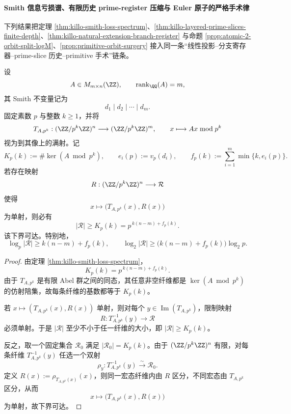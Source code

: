 \paragraph{Smith 信息亏损谱、有限历史 prime-register 压缩与 Euler 原子的严格手术律}
下列结果把定理 \ref{thm:killo-smith-loss-spectrum}、\ref{thm:killo-layered-prime-slices-finite-depth}、\ref{thm:killo-natural-extension-branch-register} 与命题 \ref{prop:atomic-2-orbit-split-logM}、\ref{prop:primitive-orbit-surgery} 接入同一条“线性投影--分支寄存器--prime-slice 历史--primitive 手术”链条。

\begin{theorem}\label{thm:xi-smith-loss-minimal-branch-register}
设
\[
A\in M_{m\times n}(\ZZ),
\qquad
\operatorname{rank}_{\QQ}(A)=m,
\]
其 Smith 不变量记为
\[
d_1\mid d_2\mid\cdots\mid d_m.
\]
固定素数 \(p\) 与整数 \(k\ge 1\)，并将
\[
T_{A,p^k}:(\ZZ/p^k\ZZ)^n\longrightarrow (\ZZ/p^k\ZZ)^m,
\qquad
x\longmapsto Ax\bmod p^k
\]
视为到其像上的满射。记
\[
K_p(k):=\#\ker(A\bmod p^k),
\qquad
e_i(p):=v_p(d_i),
\qquad
f_p(k):=\sum_{i=1}^{m}\min\{k,e_i(p)\}.
\]
若存在映射
\[
R:(\ZZ/p^k\ZZ)^n\longrightarrow \mathcal R
\]
使得
\[
x\longmapsto \bigl(T_{A,p^k}(x),R(x)\bigr)
\]
为单射，则必有
\[
|\mathcal R|\ge K_p(k)=p^{\,k(n-m)+f_p(k)}.
\]
该下界可达。特别地，
\[
\log_p|\mathcal R|\ge k(n-m)+f_p(k),
\qquad
\log_2|\mathcal R|\ge \bigl(k(n-m)+f_p(k)\bigr)\log_2 p.
\]
\end{theorem}
\begin{proof}
由定理 \ref{thm:killo-smith-loss-spectrum}，
\[
K_p(k)=p^{\,k(n-m)+f_p(k)}.
\]
由于 \(T_{A,p^k}\) 是有限 Abel 群之间的同态，其任意非空纤维都是 \(\ker(A\bmod p^k)\) 的仿射陪集，故每条纤维的基数都等于 \(K_p(k)\)。

若 \(x\mapsto (T_{A,p^k}(x),R(x))\) 单射，则对每个 \(y\in\operatorname{Im}(T_{A,p^k})\)，限制映射
\[
R:T_{A,p^k}^{-1}(y)\to \mathcal R
\]
必须单射。于是 \(|\mathcal R|\) 至少不小于任一纤维的大小，即
\(
|\mathcal R|\ge K_p(k)
\)。

反之，取一个固定集合 \(\mathcal R_0\) 满足 \(|\mathcal R_0|=K_p(k)\)。由于 \((\ZZ/p^k\ZZ)^n\) 有限，对每条纤维 \(T_{A,p^k}^{-1}(y)\) 任选一个双射
\[
\rho_y:T_{A,p^k}^{-1}(y)\xrightarrow{\sim}\mathcal R_0.
\]
定义 \(R(x):=\rho_{T_{A,p^k}(x)}(x)\)，则同一宏态纤维内由 \(R\) 区分，不同宏态由 \(T_{A,p^k}\) 区分，从而
\[
x\longmapsto \bigl(T_{A,p^k}(x),R(x)\bigr)
\]
为单射，故下界可达。
\end{proof}

